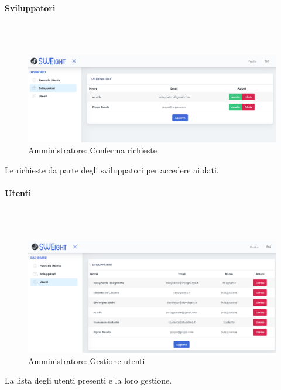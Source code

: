 		\paragraph{Sviluppatori}\mbox{}\\ \\
			\begin{figure}[H]
			\centering
			\includegraphics[width=17cm]{sez/img/amministratore/conf_ric_svil.png}
			\caption{Amministratore: Conferma richieste}\label{fig:1}
			\end{figure}
		  Le richieste da parte degli sviluppatori per accedere ai dati.


		\paragraph{Utenti}\mbox{}\\ \\
			\begin{figure}[H]
			\centering
			\includegraphics[width=17cm]{sez/img/amministratore/gestisciutenti.png}
			\caption{Amministratore: Gestione utenti}\label{fig:1}
			\end{figure}
		  La lista degli utenti presenti e la loro gestione.

